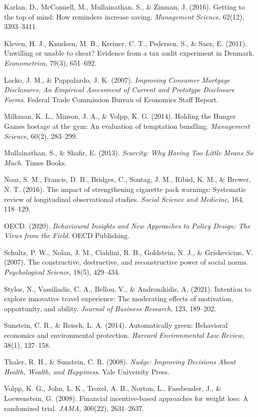\documentclass[12pt, letterpaper]{article}
\begin{document}
Karlan, D., McConnell, M., Mullainathan, S., \& Zinman, J. (2016). Getting to the top of mind: How reminders increase saving. \textit{Management Science}, 62(12), 3393--3411.

Kleven, H. J., Knudsen, M. B., Kreiner, C. T., Pedersen, S., \& Saez, E. (2011). Unwilling or unable to cheat? Evidence from a tax audit experiment in Denmark. \textit{Econometrica}, 79(3), 651--692.

Lacko, J. M., \& Pappalardo, J. K. (2007). \textit{Improving Consumer Mortgage Disclosures: An Empirical Assessment of Current and Prototype Disclosure Forms}. Federal Trade Commission Bureau of Economics Staff Report.

Milkman, K. L., Minson, J. A., \& Volpp, K. G. (2014). Holding the Hunger Games hostage at the gym: An evaluation of temptation bundling. \textit{Management Science}, 60(2), 283--299.

Mullainathan, S., \& Shafir, E. (2013). \textit{Scarcity: Why Having Too Little Means So Much}. Times Books.

Noar, S. M., Francis, D. B., Bridges, C., Sontag, J. M., Ribisl, K. M., \& Brewer, N. T. (2016). The impact of strengthening cigarette pack warnings: Systematic review of longitudinal observational studies. \textit{Social Science and Medicine}, 164, 118--129.

OECD. (2020). \textit{Behavioural Insights and New Approaches to Policy Design: The Views from the Field}. OECD Publishing.

Schultz, P. W., Nolan, J. M., Cialdini, R. B., Goldstein, N. J., \& Griskevicius, V. (2007). The constructive, destructive, and reconstructive power of social norms. \textit{Psychological Science}, 18(5), 429--434.

Stylos, N., Vassiliadis, C. A., Bellou, V., \& Andronikidis, A. (2021). Intention to explore innovative travel experience: The moderating effects of motivation, opportunity, and ability. \textit{Journal of Business Research}, 123, 189--202.

Sunstein, C. R., \& Reisch, L. A. (2014). Automatically green: Behavioral economics and environmental protection. \textit{Harvard Environmental Law Review}, 38(1), 127--158.

Thaler, R. H., \& Sunstein, C. R. (2008). \textit{Nudge: Improving Decisions About Health, Wealth, and Happiness}. Yale University Press.

Volpp, K. G., John, L. K., Troxel, A. B., Norton, L., Fassbender, J., \& Loewenstein, G. (2008). Financial incentive-based approaches for weight loss: A randomized trial. \textit{JAMA}, 300(22), 2631--2637.
\end{document}
